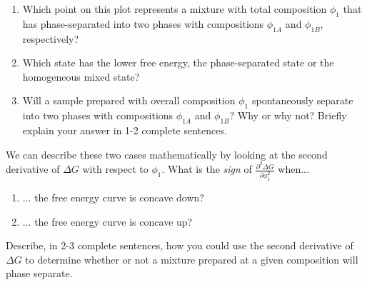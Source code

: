 \begin{activity}
\begin{ctqs}
\begin{enumerate}
				\item Which point on this plot represents a mixture with total composition $\phi_1$ that has phase-separated into two phases with compositions $\phi_{1A}$ and $\phi_{1B}$, respectively?
					
					\begin{solution}[0.75in]
					\end{solution}
					
				\item Which state has the lower free energy, the phase-separated state or the homogeneous mixed state?
					
					\begin{solution}[0.75in]
					\end{solution}
					
				\item Will a sample prepared with overall composition $\phi_1$ spontaneously separate into two phases with compositions $\phi_{1A}$ and $\phi_{1B}$?  Why or why not?  Briefly explain your answer in 1-2 complete sentences.
					
					\begin{solution}[2in]
					\end{solution}
					
			\end{enumerate}
			
		\question We can describe these two cases mathematically by looking at the second derivative of $\Delta G$ with respect to $\phi_1$.		
			What is the \emph{sign} of $\frac{\partial^2 \Delta G}{\partial \phi_1^2}$ when...
			
			\begin{enumerate}
				\item ... the free energy curve is concave down?
					
					\begin{solution}[1in]
					\end{solution}
					
				\item ... the free energy curve is concave up?
					
					\begin{solution}[1in]
					\end{solution}
					
			\end{enumerate}
		
		\question Describe, in 2-3 complete sentences, how you could use the second derivative of $\Delta G$ to determine whether or not a mixture prepared at a given composition will phase separate.
					

\end{ctqs}
\end{activity}
